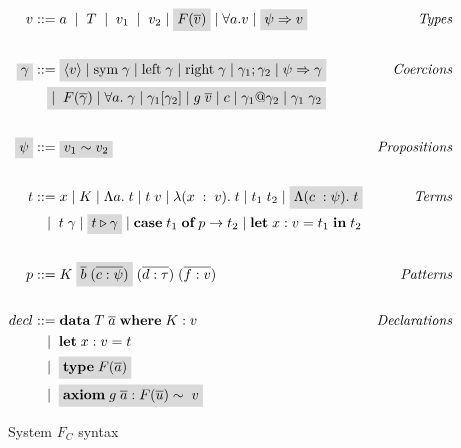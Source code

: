 \begin{figure}
\begin{align*}
    v &::= a \;  \; | \;  \; T \;  \; | \;  \; v_1 \;  \; | \;  \; v_2  \; | \;
    \highlight{F(\overline{v})}  \; | \;  \forall a. v  \; | \; \highlight{\psi
    \Rightarrow v} &\textit{Types}\\ \\
    \highlight{\gamma} &::= \highlight{\langle v \rangle \; | \; \text{sym} \; \gamma \; | \;
    \text{left} \; \gamma \; | \; \text{right} \; \gamma \; | \; \gamma_1 ;
    \gamma_2 \; | \; \psi \Rightarrow \gamma} &\textit{Coercions} \\ 
    \; &\quad \highlight{| \; \; F(\overline{\gamma}) \; | \; \forall a . \; \gamma \; | \;
    \gamma_1 [\gamma_2] \; | \; g \; \overline{v} \; | \; c \; | \; \gamma_1 @
    \gamma_2 \; | \; \gamma_1 \; \gamma_2} \\ \\
    \highlight{\psi} &::= \highlight{v_1 \sim v_2} &\textit{Propositions}\\ \\
    t &::= x \; | \; K \; | \; \Lambda a . \; t \; | \; t \; v \; | \;
    \lambda(x\; : \; v). \; t \; | \; t_1 \; t_2 \; | \; \highlight{\Lambda(c \; : \psi).
    \; t} &\textit{Terms} \\
          &\quad | \; \; t \; \gamma \; | \; \highlight{t \triangleright \gamma} \; | \;
    \textbf{case} \; t_1 \; \textbf{of} \; p \rightarrow t_2 \; | \;
    \textbf{let} \; x : v = t_1 \; \textbf{in} \; t_2 \\ \\
    p &::= K \; \highlight{\overline{b} \; (\overline{c : \psi})} \; (\overline{d : \tau})
    \; (\overline{f : v}) &\textit{Patterns}\\ \\
    decl &::= \textbf{data} \; T \; \overline{a} \; \textbf{where} \; K : v
         &\textit{Declarations}\\
         &\quad | \; \; \textbf{let} \; x : v = t \\
         &\quad | \; \; \highlight{\textbf{type} \; F(\overline{a})} \\
         &\quad | \; \; \highlight{\textbf{axiom} \; g \; \overline{a} :
         F(\overline{u}) \sim \; v} \\
\end{align*}
\caption{System $F_C$ syntax}
\label{fc-syntax}
\end{figure}

